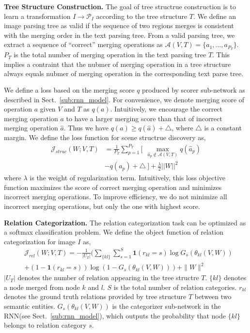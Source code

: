 \documentclass[10pt,twocolumn,letterpaper]{article}
\begin{document}
\textbf{Tree Structure Construction.}
The goal of tree structrue construction is to learn a transformation $I\rightarrow \mathcal{P}_I$ according to the tree structure $T$. We define an image parsing tree as valid if the sequence of two regions merges is consistent with the merging order in the text parsing tree. From a valid parsing tree, we extract a sequence of ``correct'' merging operations as $\mathcal{A}(V,T)=\{a_1,...,a_{P_T}\}$. $P_T$ is the total number of merging operation in the text parsing tree $T$. This implies a contraint that the nubmer of merging operation in a tree structure always equals nubmer of merging operation in the corresponding text parse tree.

We define a loss based on the merging score $q$ produced by scorer sub-network as described in Sect.~\ref{sub:rnn_model}. For convenience, we denote merging score of operation $a$ given $V$ and $T$ as $q(a)$. Intuitively, we encourage the correct merging operation $a$ to have a larger merging score than that of incorrect merging operation $\widehat{a}$. Thus we have $q(a)\geq q(\widehat{a}) + \triangle$, where $\triangle$ is a constant margin. We define the loss function for scene structrue discovery as,
\vspace{-1mm}
\begin{equation}\label{eq_structure_loss}
\begin{split}
\mathcal{J}_{struc}(W;V,T) & =  \frac{1}{P_T} \sum_{p=1}^{P_T} [ \:\: \max_{\widehat{a}_p\notin\mathcal{A}(V,T)}
q(\widehat{a}_p)\\
& - q(a_p) + \triangle \:] + \frac{\lambda}{2}||W||^2
\end{split}
\end{equation}
where $\lambda$ is the weight of regularization term. Intuitively, this loss objective function maximizes the score of correct merging operation and minimizes incorrect merging operations. To improve efficiency, we do not minimize all incorrect merging operations, but only the one with highest score.


\textbf{Relation Categorization.}
The relation categorization task can be optimized as a softmax classification problem. We define the object function of relation categorization for image $I$ as,
\begin{equation}\label{eq_relation_loss}
\begin{split}
& \mathcal{J}_{rel}(W;V,T) = -\frac{1}{|U_T|}(  \sum_{\{kl\}} \sum_{s=1}^S \textbf{1}(r_{kl}=s)\log G_s(\theta_{kl}(V,W))  \\
& +(1-\textbf{1}(r_{kl}=s))\log(1-G_s(\theta_{kl}(V,W))  ) + \|W\|^2
\end{split}
\end{equation}
$|U_T|$ denotes the number of relation appearing in the tree structre $T$. $\{kl\}$ denotes a node merged from node $k$ and $l$. $S$ is the total number of relation categories. $r_{kl}$ denotes the ground truth relations provided by tree structure $T$ between two semantic entities. $G_s(\theta_{kl}(V,W))$ is the categorizer sub-network in the RNN(see Sect.~\ref{sub:rnn_model}), which outputs the probability that node $\{kl\}$ belongs to relation category $s$.
\end{document}
